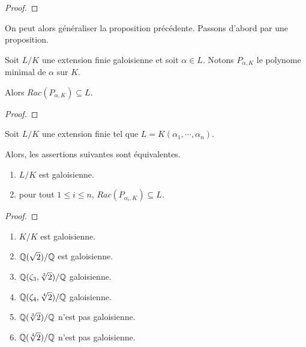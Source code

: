\ifdefined\outputproof
\begin{proof}

\end{proof}
\fi

On peut alors généraliser la proposition précédente. Passons d'abord par une proposition.

\begin{proposition}
	Soit $L/K$ une extension finie galoisienne et soit $\alpha \in L$.
	Notons $P_{\alpha, K}$ le polynome minimal de $\alpha$ sur $K$.

	Alors $Rac(P_{\alpha, K}) \subseteq L$.
\end{proposition}

\ifdefined\outputproof
\begin{proof}

\end{proof}
\fi

\begin{proposition}
	Soit $L/K$ une extension finie tel que $L = K(\alpha_{1}, \cdots,
	\alpha_{n})$.

	Alors, les assertions suivantes sont équivalentes.

	\begin{enumerate}
		\item $L/K$ est galoisienne.
		\item pour tout $1 \leq i \leq n$, $Rac(P_{\alpha_{i}, K}) \subseteq L$.
	\end{enumerate}
\end{proposition}

\ifdefined\outputproof
\begin{proof}

\end{proof}
\fi

\begin{exemple} [Exercice]
	\begin{enumerate}
		\item $K/K$ est galoisienne.
		\item $\mathbb{Q}(\sqrt{2})/\mathbb{Q}$ est galoisienne.
		\item $\mathbb{Q}(\zeta_{3}, \sqrt[3]{2})/\mathbb{Q}$ galoisienne.
		\item $\mathbb{Q}(\zeta_{4}, \sqrt[4]{2})/\mathbb{Q}$ galoisienne.
		\item $\mathbb{Q}(\sqrt[3]{2})/\mathbb{Q}$ n'est pas galoisienne.
		\item $\mathbb{Q}(\sqrt[4]{2})/\mathbb{Q}$ n'est pas galoisienne.
	\end{enumerate}
\end{exemple}

